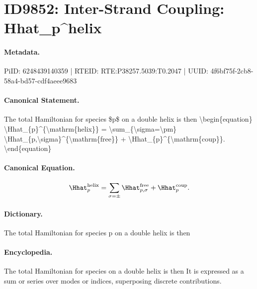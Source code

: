 \section*{ID9852: Inter-Strand Coupling: Hhat\_p\textasciicircum{}helix}
\paragraph{Metadata.}
PiID: 6248439140359 | RTEID: RTE:P38257.5039:T0.2047 | UUID: 4f6bf75f-2cb8-58a4-bd57-cdf4aeee9683

\paragraph{Canonical Statement.}
The total Hamiltonian for species \$p\$ on a double helix is then \textbackslash{}begin\{equation\} \textbackslash{}Hhat\_\{p\}\textasciicircum{}\{\textbackslash{}mathrm\{helix\}\} = \textbackslash{}sum\_\{\textbackslash{}sigma=\textbackslash{}pm\} \textbackslash{}Hhat\_\{p,\textbackslash{}sigma\}\textasciicircum{}\{\textbackslash{}mathrm\{free\}\} + \textbackslash{}Hhat\_\{p\}\textasciicircum{}\{\textbackslash{}mathrm\{coup\}\}. \textbackslash{}end\{equation\}

\paragraph{Canonical Equation.}
\[
\Hhat_{p}^{\mathrm{helix}} = \sum_{\sigma=\pm} \Hhat_{p,\sigma}^{\mathrm{free}} + \Hhat_{p}^{\mathrm{coup}}.
\]

\paragraph{Dictionary.}
The total Hamiltonian for species p on a double helix is then

\paragraph{Encyclopedia.}
The total Hamiltonian for species on a double helix is then It is expressed as a sum or series over modes or indices, superposing discrete contributions.
